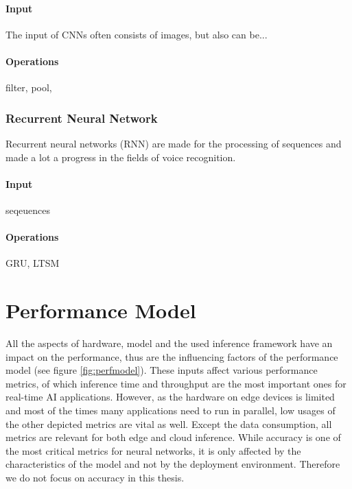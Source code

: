 \paragraph{Input}
The input of CNNs often consists of images, but also can be...

\paragraph{Operations}
filter, pool, 
\subsubsection{Recurrent Neural Network}
Recurrent neural networks (RNN) are made for the processing of sequences and made a lot a progress in the fields of voice recognition.
\paragraph{Input}
seqeuences
\paragraph{Operations}
GRU, LTSM


\section{Performance Model}
All the aspects of hardware, model and the used inference framework have an impact on the performance, thus are the influencing factors of the performance model (see figure \ref{fig:perfmodel}). These inputs affect various performance metrics, of which inference time and throughput are the most important ones for real-time AI applications. However, as the hardware on edge devices is limited and most of the times many applications need to run in parallel, low usages of the other depicted metrics are vital as well.
Except the data consumption, all metrics are relevant for both edge and cloud inference.
While accuracy is one of the most critical metrics for neural networks, it is only affected by the characteristics of the model and not by the deployment environment. Therefore we do not focus on accuracy in this thesis.

